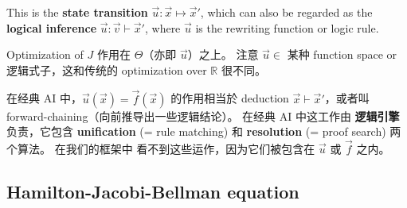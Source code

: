 \documentclass[12pt, orivec]{article}
\newcommand{\cc}[2]{#1}
\newcommand{\cc}[2]{#2}
\begin{document}
\cc{This is the \textbf{state transition} $\vec{u}: \vec{x} \mapsto \vec{x}'$, which can also be regarded as the \textbf{logical inference} $\vec{u}: \vec{v} \vdash \vec{x}'$, where $\vec{u}$ is the rewriting function or logic rule.
}{
This is the \textbf{state transition} $\vec{u}: \vec{x} \mapsto \vec{x}'$, which can also be regarded as the \textbf{logical inference} $\vec{u}: \vec{v} \vdash \vec{x}'$, where $\vec{u}$ is the rewriting function or logic rule.}

\cc{Optimization of $J$ 作用在 $\Theta$（亦即 $\vec{u}$）之上。  注意 $\vec{u} \in$ 某种 function space or 逻辑式子，这和传统的 optimization over $\mathbb{R}$ 很不同。 
}{
Optimization of $J$ acts over $\Theta$ (ie $\vec{u}$). Note that $\vec{u}$ belongs in a function space or the space of logic formulas, which is very different from the traditional optimization over $\mathbb{R}$.}

\footnotesize
\cc{在经典 AI 中，$\vec{u}(\vec{x}) = \vec{f}(\vec{x})$ 的作用相当於 deduction $\vec{x} \vdash \vec{x}'$，或者叫 forward-chaining（向前推导出一些逻辑结论）。  在经典 AI 中这工作由 \textbf{逻辑引擎} 负责，它包含 \textbf{unification} (= rule matching) 和 \textbf{resolution} (= proof search) 两个算法。  在我们的框架中 看不到这些运作，因为它们被包含在 $\vec{u}$ 或 $\vec{f}$ 之内。 
}{
In classic AI, $\vec{u}(\vec{x}) = \vec{f}(\vec{x})$ is equivalent to the deduction $\vec{x} \vdash \vec{x} '$, also known as \textbf{forward-chaining} (deduce logical conclusions).  In classic AI this job is handled by an \textbf{inference engine}, which consists of 2 algorithms: \textbf{unification} (= rule matching) and \textbf{resolution} (= proof search). These operations are not visible in our framework as they are absorbed into $\vec{u}$ or $\vec{f}$.}
\normalsize


\subsection{Hamilton-Jacobi-Bellman equation}
\end{document}
